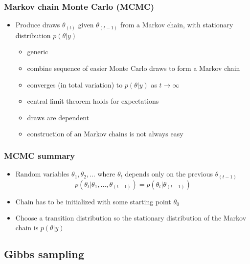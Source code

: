 \documentclass[10pt]{beamer}
\begin{document}
\begin{frame}

\frametitle{Markov chain Monte Carlo (MCMC)}

  \begin{itemize}
  \item Produce draws $\theta_{(t)}$ given $\theta_{(t-1)}$ from a
    Markov chain, with {\color{uured}stationary distribution} $p(\theta|y)$
    \begin{itemize}
    \item<2->[+] generic
    \item<2->[+] combine sequence of easier Monte Carlo draws to form a Markov chain
    \item<3->[+] converges (in total variation) to $p(\theta|y)$ as $t\rightarrow\infty$
    \item<4->[+] central limit theorem holds for expectations
    \item<5->[-] draws are dependent
    \item<5->[-] construction of an  Markov chains is not always easy
    \end{itemize}
\end{itemize}

\end{frame}

\begin{frame}

\frametitle{MCMC summary}

  \begin{itemize}
  \item Random variables $\theta_1,\theta_2,\ldots$ where $\theta_t$ depends only on the previous $\theta_{(t-1)}$
    \begin{equation*}
      p(\theta_t|\theta_1,\ldots,\theta_{(t-1)})=p(\theta_t|\theta_{(t-1)})
    \end{equation*}
    \pause
  \item Chain has to be initialized with some starting point $\theta_0$ \pause
  \item Choose a transition distribution so the
    {\color{uured}stationary distribution} of the Markov chain is $p(\theta|y)$
  \end{itemize}

\end{frame}

\subsection{Gibbs sampling}
\frame{\subsectionpage}
\end{document}
